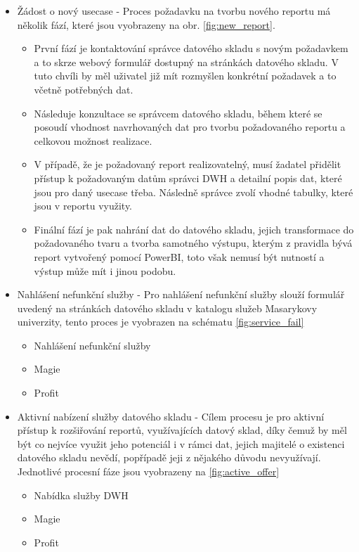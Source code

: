 \documentclass[
  digital,     %
  twoside,     %
  lof,         %
  lot,         %
]{fithesis4}
\begin{document}
\begin{itemize}
  \item Žádost o nový usecase - Proces požadavku na tvorbu nového reportu má několik fází, které jsou vyobrazeny na obr. \ref{fig:new_report}. 
        \begin{itemize}
            \item První fází je kontaktování správce datového skladu s novým požadavkem a to skrze webový formulář dostupný na stránkách datového skladu. V tuto chvíli by měl uživatel již mít rozmyšlen konkrétní požadavek a to včetně potřebných dat. 
            \item Následuje konzultace se správcem datového skladu, během které se posoudí vhodnost navrhovaných dat pro tvorbu požadovaného reportu a celkovou možnost realizace.
            \item V případě, že je požadovaný report realizovatelný, musí žadatel přidělit přístup k požadovaným datům správci DWH a detailní popis dat, které jsou pro daný usecase třeba. Následně správce zvolí vhodné tabulky, které jsou v reportu využity.
            \item Finální fází je pak nahrání dat do datového skladu, jejich transformace do požadovaného tvaru a tvorba samotného výstupu, kterým z pravidla bývá report vytvořený pomocí PowerBI, toto však nemusí být nutností a výstup může mít i jinou podobu. 
        \end{itemize}
  \item Nahlášení nefunkční služby - Pro nahlášení nefunkční služby slouží formulář uvedený na stránkách datového skladu v katalogu služeb Masarykovy univerzity, tento proces je vyobrazen na schématu \ref{fig:service_fail}
        \begin{itemize}
            \item Nahlášení nefunkční služby
            \item Magie
            \item Profit
        \end{itemize}
  \item Aktivní nabízení služby datového skladu - Cílem procesu je pro aktivní přístup k rozšiřování reportů, využívajících datový sklad, díky čemuž by měl být co nejvíce využit jeho potenciál i v rámci dat, jejich majitelé o existenci datového skladu nevědí, popřípadě jeji z nějakého důvodu nevyužívají. Jednotlivé procesní fáze jsou vyobrazeny na \ref{fig:active_offer}
        \begin{itemize}
            \item Nabídka služby DWH
            \item Magie
            \item Profit
        \end{itemize}
\end{itemize}
\end{document}
